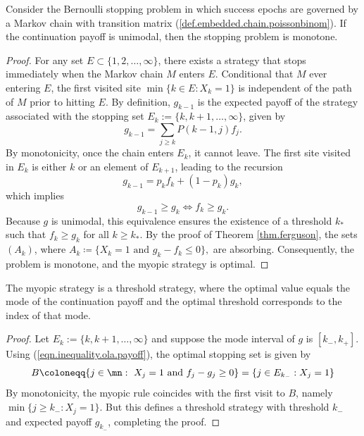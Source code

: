 \documentclass[11pt]{article}
\begin{document}
\begin{thm} \label{thm.unimodal.myopic}
	Consider the Bernoulli stopping problem in which success epochs are governed by a Markov chain with transition matrix (\ref{def.embedded.chain.poissonbinom}). If the continuation payoff is unimodal, then the stopping problem is monotone.%
\end{thm}
\begin{proof}
	For any set $E\subset \{1,2,\ldots,\infty\}$, there exists a strategy that stops immediately when the Markov chain $M$ enters $E$. Conditional that $M$ ever entering $E$, the first visited  site $\min\{k\in E: X_k=1\}$ is independent of the path of $M$ prior to hitting $E$. By definition, $g_{k-1}$ is the expected payoff of the strategy associated with the stopping set $E_k:=\{k, k+1,\ldots,\infty\}$, given by
	\begin{equation}\label{eqn.expected.ola.payoff}
		g_{k-1}=\sum_{j\ge k} P(k-1,j)f_j.
	\end{equation}
	By monotonicity, once the chain enters \(E_k \), it cannot leave. 	The first site visited in $E_k$ is either $k$ or an element of $E_{k+1}$, leading to the recursion
	\begin{equation}\label{recursion.g.f}
		g_{k-1}=p_k f_k + (1-p_k)g_{k},
	\end{equation}
	which implies
	\begin{equation}\label{eqn.inequality.ola.payoff}
		g_{k-1}\geq g_{k}\Longleftrightarrow  f_k\geq g_{k}.
	\end{equation}
	Because $g$ is unimodal, this equivalence ensures the existence of a threshold $k_*$ such that $f_k \ge g_k$ for all $k \ge k_*$. By the proof of Theorem \ref{thm.ferguson},   the sets $(A_k)$, where $A_k \coloneqq \{ X_k =1 \text { and } g_k - f_k \le 0 \},$ are absorbing. Consequently, the problem is monotone, and the myopic strategy is optimal.
\end{proof}




\begin{cor}\label{cor.threshold}
	The myopic strategy  is a threshold strategy, where the optimal value equals  the mode of the continuation payoff and the optimal threshold corresponds to the index of that mode.
\end{cor}
\begin{proof}
	Let $E_k:=\{k, k+1,\ldots,\infty\}$ and suppose the mode interval of $g$ is $[k_-, k_+]$. Using (\ref{eqn.inequality.ola.payoff}), the optimal stopping set is given by   
	\begin{equation}\label{eq.stoppingset}
B \coloneqq \{j \in \mn: ~X_j =1 \text { and } f_j-g_j \ge 0 \} = \{ j \in E_{k_-}: X_j = 1 \}
	\end{equation}
	By monotonicity,  the myopic rule  coincides with the first visit to $B$, namely
	$\min \{j \ge k_-: X_j=1\}$. But this defines a threshold strategy with threshold \( k_- \) and expected payoff \( g_{k_-} \), completing the proof.
\end{proof}
\end{document}

